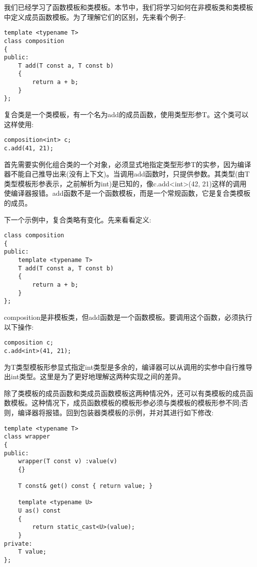 我们已经学习了函数模板和类模板。本节中，我们将学习如何在非模板类和类模板中定义成员函数模板。为了理解它们的区别，先来看个例子:

\begin{lstlisting}[style=styleCXX]
template <typename T>
class composition
{
public:
	T add(T const a, T const b)
	{
		return a + b;
	}
};
\end{lstlisting}

复合类是一个类模板，有一个名为add的成员函数，使用类型形参T。这个类可以这样使用:

\begin{lstlisting}[style=styleCXX]
composition<int> c;
c.add(41, 21);
\end{lstlisting}

首先需要实例化组合类的一个对象，必须显式地指定类型形参T的实参，因为编译器不能自己推导出来(没有上下文)。当调用add函数时，只提供参数。其类型(由T类型模板形参表示，之前解析为int)是已知的，像c.add<int>(42, 21)这样的调用使编译器报错。add函数不是一个函数模板，而是一个常规函数，它是复合类模板的成员。

下一个示例中，复合类略有变化。先来看看定义:

\begin{lstlisting}[style=styleCXX]
class composition
{
public:
	template <typename T>
	T add(T const a, T const b)
	{
		return a + b;
	}
};
\end{lstlisting}

composition是非模板类，但add函数是一个函数模板。要调用这个函数，必须执行以下操作:

\begin{lstlisting}[style=styleCXX]
composition c;
c.add<int>(41, 21);
\end{lstlisting}

为T类型模板形参显式指定int类型是多余的，编译器可以从调用的实参中自行推导出int类型。这里是为了更好地理解这两种实现之间的差异。

除了类模板的成员函数和类成员函数模板这两种情况外，还可以有类模板的成员函数模板。这种情况下，成员函数模板的模板形参必须与类模板的模板形参不同;否则，编译器将报错。回到包装器类模板的示例，并对其进行如下修改:

\begin{lstlisting}[style=styleCXX]
template <typename T>
class wrapper
{
public:
	wrapper(T const v) :value(v)
	{}
	
	T const& get() const { return value; }
	
	template <typename U>
	U as() const
	{
		return static_cast<U>(value);
	}
private:
	T value;
};
\end{lstlisting}

